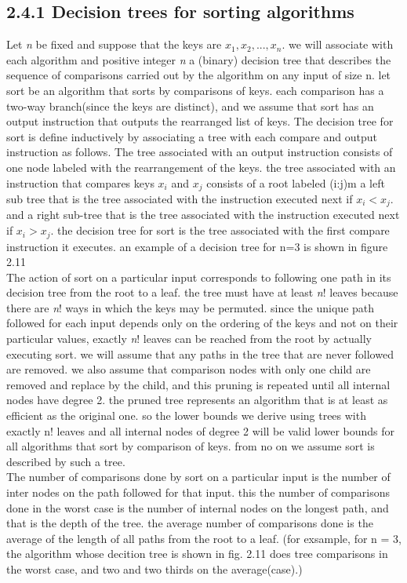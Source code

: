 \documentclass[a4paper,10pt,titlepage]{report}
\begin{document}
\subsection{2.4.1 Decision trees for sorting algorithms}
Let \textit{n} be fixed and suppose that the keys are $x_1,x_2,...,x_n$. we will associate with each algorithm and positive integer \textit{n} a (binary) decision tree that describes the sequence of comparisons carried out by the algorithm on any input of size n. let sort be an algorithm that sorts by comparisons of keys. each comparison has a two-way branch(since the keys are distinct), and we assume that sort has an output instruction that outputs the rearranged list of keys. The decision tree for sort is define inductively by associating a tree with each compare and output instruction as follows. The tree associated with an output instruction consists of one node labeled with the rearrangement of the keys. the tree associated with an instruction that compares keys $x_i$ and $x_j$ consists of a root labeled (i:j)m a left sub tree that is the tree associated with the instruction executed next if $x_i < x_j$. and a right sub-tree that is the tree associated with the instruction executed next if $x_i > x_j$. the decision tree for sort is the tree associated with the first compare instruction it executes. an example of a decision tree for n=3 is shown in figure 2.11\\
\vspace{10mm}
The action of sort on a particular input corresponds to following one path in its decision tree from the root to a leaf. the tree must have at least \textit{n}! leaves because there are \textit{n}! ways in which the keys may be permuted. since the unique path followed for each input depends only on the ordering of the keys and not on their particular values, exactly \textit{n}! leaves can be reached from the root by actually executing sort. we will assume that any paths in the tree that are never followed are removed. we also assume that comparison nodes with only one child are removed and replace by the child, and this pruning is repeated until all internal nodes have degree 2. the pruned tree represents an algorithm that is at least as efficient as the original one. so the lower bounds we derive using trees with exactly n! leaves and all internal nodes of degree 2 will be valid lower bounds for all algorithms that sort by comparison of keys. from no on we assume sort is described by such a tree.\\
\vspace{10mm}
The number of comparisons done by sort on a particular input is the number of inter nodes on the path followed for that input. this the number of comparisons done in the worst case is the number of internal nodes on the longest path, and that is the depth of the tree. the average number of comparisons done is the average of the length of all paths from the root to a leaf. (for exsample, for n = 3, the algorithm whose decition tree is shown in fig. 2.11 does tree comparisons in the worst case, and two and two thirds on the average(case).)\\
\end{document}
